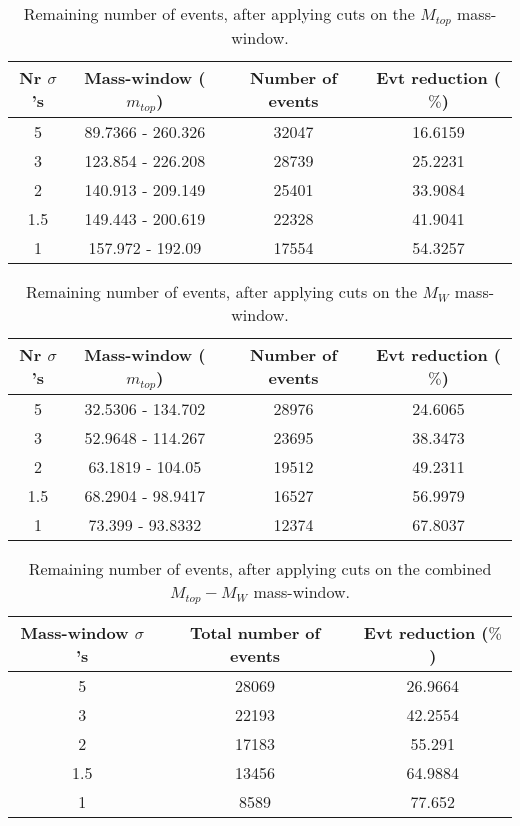 \documentclass{article}
\begin{document}
 \begin{table}[h!t] 
  \caption{Remaining number of events, after applying cuts on the $M_{top}$ mass-window.} 
  \centering 
   \begin{tabular}{c|c|c|c|}
     Nr $\sigma$'s & Mass-window ($m_{top}$)   & Number of events   & Evt reduction ($\%$)     \\
     \hline
     5 & 89.7366 - 260.326  &   32047 &  16.6159 \\ 
     3 & 123.854 - 226.208  &   28739 &  25.2231 \\ 
     2 & 140.913 - 209.149  &   25401 &  33.9084 \\ 
     1.5 & 149.443 - 200.619  &   22328 &  41.9041 \\ 
     1 & 157.972 - 192.09  &   17554 &  54.3257 \\ 
   \end{tabular} 
 \end{table} 
 
 \begin{table}[h!t] 
  \caption{Remaining number of events, after applying cuts on the $M_{W}$ mass-window.} 
  \centering 
   \begin{tabular}{c|c|c|c|}
     Nr $\sigma$'s & Mass-window ($m_{top}$)    & Number of events   & Evt reduction ($\%$)    \\
     \hline
     5 & 32.5306 - 134.702  &   28976 & 24.6065 \\ 
     3 & 52.9648 - 114.267  &   23695 & 38.3473 \\ 
     2 & 63.1819 - 104.05  &   19512 & 49.2311 \\ 
     1.5 & 68.2904 - 98.9417  &   16527 & 56.9979 \\ 
     1 & 73.399 - 93.8332  &   12374 & 67.8037 \\ 
   \end{tabular} 
 \end{table} 
 
 \begin{table}[h!t] 
  \caption{Remaining number of events, after applying cuts on the combined $M_{top}-M_{W}$ mass-window.} 
  \centering 
   \begin{tabular}{c|c|c|} 
     Mass-window $\sigma$'s & Total number of events    & Evt reduction ($\%$)     \\ 
     \hline
     5 & 28069 & 26.9664 \\ 
     3 & 22193 & 42.2554 \\ 
     2 & 17183 & 55.291 \\ 
     1.5 & 13456 & 64.9884 \\ 
     1 & 8589 & 77.652 \\ 
   \end{tabular} 
 \end{table} 
 
\end{document}
